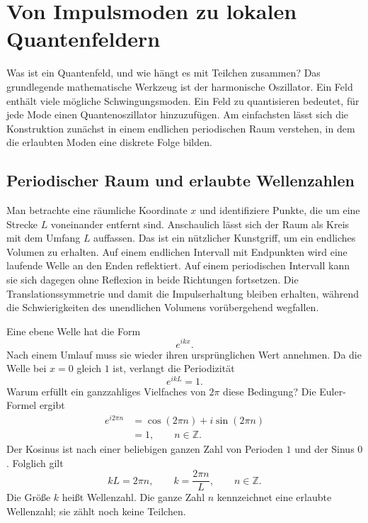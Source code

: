 \chapter{Von Impulsmoden zu lokalen Quantenfeldern}

Was ist ein Quantenfeld, und wie hängt es mit Teilchen zusammen? Das grundlegende mathematische Werkzeug ist der harmonische Oszillator. Ein Feld enthält viele mögliche Schwingungsmoden. Ein Feld zu quantisieren bedeutet, für jede Mode einen Quantenoszillator hinzuzufügen. Am einfachsten lässt sich die Konstruktion zunächst in einem endlichen periodischen Raum verstehen, in dem die erlaubten Moden eine diskrete Folge bilden.

\section{Periodischer Raum und erlaubte Wellenzahlen}

Man betrachte eine räumliche Koordinate \(x\) und identifiziere Punkte, die um eine Strecke \(L\) voneinander entfernt sind. Anschaulich lässt sich der Raum als Kreis mit dem Umfang \(L\) auffassen. Das ist ein nützlicher Kunstgriff, um ein endliches Volumen zu erhalten. Auf einem endlichen Intervall mit Endpunkten wird eine laufende Welle an den Enden reflektiert. Auf einem periodischen Intervall kann sie sich dagegen ohne Reflexion in beide Richtungen fortsetzen. Die Translationssymmetrie und damit die Impulserhaltung bleiben erhalten, während die Schwierigkeiten des unendlichen Volumens vorübergehend wegfallen.

Eine ebene Welle hat die Form
\begin{equation}
e^{ikx}.
\end{equation}
Nach einem Umlauf muss sie wieder ihren ursprünglichen Wert annehmen. Da die Welle bei \(x=0\) gleich \(1\) ist, verlangt die Periodizität
\begin{equation}
e^{ikL}=1.
\end{equation}
Warum erfüllt ein ganzzahliges Vielfaches von \(2\pi\) diese Bedingung? Die Euler-Formel ergibt
\begin{align}
e^{i2\pi n}
&=\cos(2\pi n)+i\sin(2\pi n)\\
&=1,
\qquad n\in\mathbb Z.
\end{align}
Der Kosinus ist nach einer beliebigen ganzen Zahl von Perioden \(1\) und der Sinus \(0\). Folglich gilt
\begin{equation}
kL=2\pi n,
\qquad
k=\frac{2\pi n}{L},
\qquad n\in\mathbb Z.
\end{equation}
Die Größe \(k\) heißt Wellenzahl. Die ganze Zahl \(n\) kennzeichnet eine erlaubte Wellenzahl; sie zählt noch keine Teilchen.

